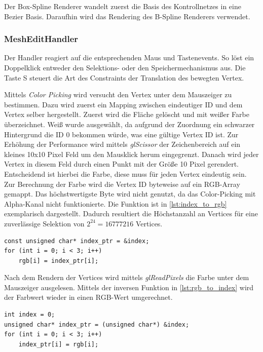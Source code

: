 Der Box-Spline Renderer wandelt zuerst die Basis des Kontrollnetzes in eine Bezier Basis. Daraufhin wird das Rendering des B-Spline Renderers verwendet.


\subsubsection{MeshEditHandler}

Der Handler reagiert auf die entsprechenden Maus und Tastenevents.
So löst ein Doppelklick entweder den Selektions- oder den Speichermechanismus aus.
Die Taste S steuert die Art des Constraints der Translation des bewegten Vertex.

Mittels \emph{Color Picking} wird versucht den Vertex unter dem Mauszeiger zu bestimmen.
Dazu wird zuerst ein Mapping zwischen eindeutiger ID und dem Vertex selber hergestellt.
Zuerst wird die Fläche gelöscht und mit weißer Farbe überzeichnet.
Weiß wurde ausgewählt, da aufgrund der Zuordnung ein schwarzer Hintergrund die ID 0 bekommen würde, was eine gültige Vertex ID ist.
Zur Erhöhung der Performance wird mittels \emph{glScissor} der Zeichenbereich auf ein kleines 10x10 Pixel Feld um den Mausklick herum eingegrenzt.
Danach wird jeder Vertex in diesem Feld durch einen Punkt mit der Größe 10 Pixel gerendert.
Entscheidend ist hierbei die Farbe, diese muss für jeden Vertex eindeutig sein.
Zur Berechnung der Farbe wird die Vertex ID byteweise auf ein RGB-Array gemappt.
Das höchstwertigste Byte wird nicht genutzt, da das Color-Picking mit Alpha-Kanal nicht funktionierte.
Die Funktion ist in \autoref{lst:index_to_rgb} exemplarisch dargestellt.
Dadurch resultiert die Höchstanzahl an Vertices für eine zuverlässige Selektion von $2^{24} = 16777216$ Vertices.

\begin{lstlisting}[style=myCppStyle, caption={Umrechnung Index nach Farbwert}, label=lst:index_to_rgb]
const unsigned char* index_ptr = &index;
for (int i = 0; i < 3; i++)
	rgb[i] = index_ptr[i];
\end{lstlisting}

Nach dem Rendern der Vertices wird mittels \emph{glReadPixels} die Farbe unter dem Mauszeiger ausgelesen.
Mittels der inversen Funktion in \autoref{lst:rgb_to_index} wird der Farbwert wieder in einen RGB-Wert umgerechnet.

\begin{lstlisting}[style=myCppStyle, caption={Inverse Funktion: Farbwert nach Index}, label=lst:rgb_to_index]
int index = 0;
unsigned char* index_ptr = (unsigned char*) &index;
for (int i = 0; i < 3; i++)
	index_ptr[i] = rgb[i];
\end{lstlisting}

